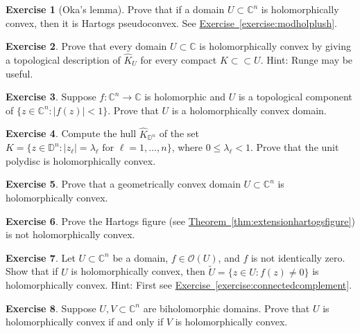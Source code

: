 \documentclass[12pt,openany]{book}
\newcommand{\sabs}[1]{\lvert {#1} \rvert}
\newcommand{\C}{{\mathbb{C}}}
\newcommand{\D}{{\mathbb{D}}}
\newcommand{\sO}{{\mathscr{O}}}
\theoremstyle{plain}
\theoremstyle{remark}
\theoremstyle{definition}
\newenvironment{exbox}{%
    \def\FrameCommand{\vrule width 1pt \relax\hspace{10pt}}%
    \MakeFramed{\advance\hsize-\width\FrameRestore}%
}{%
    \endMakeFramed
}
\theoremstyle{exercise}
\newtheorem{exercise}{Exercise}[section]
\theoremstyle{example}
\newcommand{\exerciseref}[1]{\hyperref[#1]{Exercise~\ref*{#1}}}
\newcommand{\thmref}[1]{\hyperref[#1]{Theorem~\ref*{#1}}}
\begin{document}
\begin{exbox}
\begin{exercise}[Oka's lemma]
Prove that if a domain $U \subset \C^n$ is holomorphically convex,
then it is Hartogs pseudoconvex.
See \exerciseref{exercise:modholplush}.
\end{exercise}

\begin{exercise}
Prove that every domain $U \subset \C$ is holomorphically convex by
giving a topological description of $\widehat{K}_U$ for every
compact $K \subset \subset U$.  Hint: Runge may be useful.
\end{exercise}

\begin{exercise}
Suppose $f \colon \C^n \to \C$ is holomorphic and $U$ is a topological
component of $\bigl\{ z \in \C^n : \sabs{f(z)} < 1 \bigr\}$.  Prove
that $U$ is a holomorphically convex domain.
\end{exercise}

\begin{exercise}
Compute the hull
$\widehat{K}_{\D^n}$ of the set $K = \bigl\{ z \in \D^n : \sabs{z_\ell} =
\lambda_\ell \text{ for } \ell=1,\ldots,n \bigr\}$, where $0 \leq \lambda_\ell < 1$.
Prove that the unit polydisc is holomorphically convex.
\end{exercise}

\begin{exercise}
Prove that a geometrically convex domain $U \subset \C^n$
is holomorphically convex.
\end{exercise}

\begin{exercise}
Prove the Hartogs figure (see \thmref{thm:extensionhartogsfigure})
is not holomorphically convex.
\end{exercise}

\begin{exercise}
Let $U \subset \C^n$ be a domain, $f \in \sO(U)$, and $f$ is not identically
zero.  Show that if
$U$ is holomorphically convex, then
$\widetilde{U} = \bigl\{ z \in U : f(z) \not= 0 \bigr\}$
is holomorphically convex.
Hint: First see \exerciseref{exercise:connectedcomplement}.
\end{exercise}

\begin{exercise} \label{exercise:biholholconvex}
Suppose $U,V \subset \C^n$ are biholomorphic domains.
Prove that $U$ is holomorphically convex if and only if $V$ is
holomorphically convex.
\end{exercise}


\end{exbox}
\end{document}
